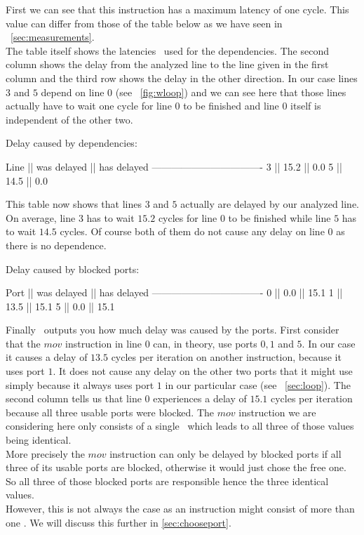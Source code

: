 First we can see that this instruction has a maximum latency of one cycle. This value can differ from those of the table below as we have seen in ~\autoref{sec:measurements}.\\
The table itself shows the latencies \suaca\ used for the dependencies. The second column shows the delay from the analyzed line to the line given in the first column and the third row shows the delay in the other direction. In our case lines $3$ and $5$ depend on line $0$ (see ~\autoref{fig:wloop}) and we can see here that those lines actually have to wait one cycle for line $0$ to be finished and line $0$ itself is independent of the other two.\\

\begin{Example}
Delay caused by dependencies:

Line || was delayed || has delayed
----------------------------------
 3   ||    15.2     ||     0.0
 5   ||    14.5     ||     0.0
\end{Example}

This table now shows that lines $3$ and $5$ actually are delayed by our analyzed line. On average, line $3$ has to wait $15.2$ cycles for line $0$ to be finished while line $5$ has to wait $14.5$ cycles. Of course both of them do not cause any delay on line $0$ as there is no dependence.\\

\begin{Example}
Delay caused by blocked ports:

Port || was delayed || has delayed
----------------------------------
 0   ||     0.0     ||    15.1
 1   ||    13.5     ||    15.1
 5   ||     0.0     ||    15.1
\end{Example}

Finally \suaca\ outputs you how much delay was caused by the ports. First consider that the $mov$ instruction in line $0$ can, in theory, use ports $0, 1$ and $5$. In our case it causes a delay of $13.5$ cycles per iteration on another instruction, because it uses port $1$. It does not cause any delay on the other two ports that it might use simply because it always uses port $1$ in our particular case (see ~\autoref{sec:loop}). The second column tells us that line $0$ experiences a delay of $15.1$ cycles per iteration because all three usable ports were blocked. The $mov$ instruction we are considering here only consists of a single \microop\ which leads to all three of those values being identical.\\
More precisely the $mov$ instruction can only be delayed by blocked ports if all three of its usable ports are blocked, otherwise it would just chose the free one. So all three of those blocked ports are responsible hence the three identical values.\\
However, this is not always the case as an instruction might consist of more than one \microop. We will discuss this further in \autoref{sec:chooseport}.





